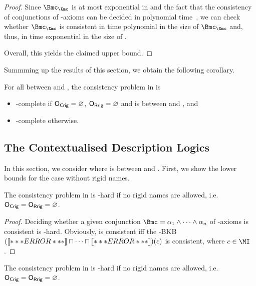 \begin{proof}
    \noindent Since $\Bmc_{\Xmc}$ is at most exponential in \Bmc and the fact that the consistency
    of conjunctions of \ELObot-axioms can be decided in polynomial time~\cite{BaBL-IJCAI05}, we can
    check whether $\Bmc_{\Xmc}$ is consistent in time polynomial in the size of $\Bmc_{\Xmc}$ and,
    thus, in time exponential in the size of \Bmc.

    Overall, this yields the claimed upper bound.
\end{proof}

Summming up the results of this section, we obtain the following corollary.

\begin{corollary}
  For all \LM between \ALC and \SHOIQ, the consistency problem in \LMEL is
  \begin{itemize}
  \item \ExpTime-complete if $\OCR=\emptyset$, $\ORR=\emptyset$ and \LM is between \ALC and \SHOQ,
    and
  \item \NExpTime-complete otherwise.
  \end{itemize}
\end{corollary}

\subsection{The Contextualised Description Logics \texorpdfstring{\ELLO}{LM⟦LO⟧}}
\label{sec:dlouter-el}

In this section, we consider \ELLO where \LO is between \ALC and \SHOQ.
%
First, we show the lower bounds for the case without rigid names.

\begin{theorem}\label{thm:elalc-exp-hard-no-rigid}
  The consistency problem in \ELALC is \ExpTime-hard if no rigid names are allowed, i.e.\ $\OCR = \ORR = \emptyset$.
\end{theorem}

\begin{proof}
  Deciding whether a given conjunction $\Bmc = \alpha_{1} \land \dots \land \alpha_{n}$ of \ALC-axioms
  is consistent is \ExpTime-hard\cite{Sch-IJCAI91}.  Obviously, \Bmc is consistent iff the \ELALC-BKB
  $(\oax{\alpha_{1}} \sqcap \dots \sqcap \oax{\alpha_{n}})(c)$ is consistent, where $c\in\MI$.
\end{proof}

\begin{theorem}\label{thm:elshoiq-lower-no-rigid}
  The consistency problem in \ELSHOIQ is \NExpTime-hard if no rigid names are allowed, i.e.\ $\OCR = \ORR = \emptyset$.
\end{theorem}

